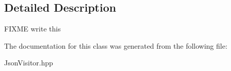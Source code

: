\subsection{Detailed Description}
F\+I\+X\+ME write this 

The documentation for this class was generated from the following file\+:\begin{DoxyCompactItemize}
\item 
Json\+Visitor.\+hpp\end{DoxyCompactItemize}

